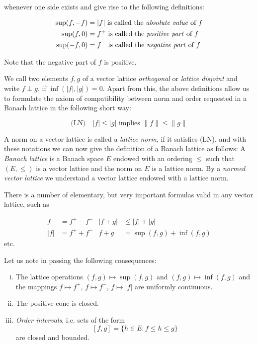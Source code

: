 \pagebreak

whenever one side exists and give rise to the following definitions:

\begin{align*}
\sup(f,-f) &= |f| \text{ is called the \emph{absolute value} of } f \\
\sup(f,0) &= f^{+} \text{ is called the \emph{positive part} of } f \\
\sup(-f,0) &= f^{-} \text{ is called the \emph{negative part} of } f
\end{align*}

Note that the negative part of $ f $ is positive.

We call two elements $ f, g $ of a vector lattice \emph{orthogonal} or \emph{lattice disjoint} and write $ f \perp g $, if $ \inf(|f|,|g|) = 0 $.
Apart from this, the above definitions allow us to formulate the axiom of compatibility between norm and order requested in a Banach lattice in the following short way:

\begin{equation}\label{eq:c1-1}
\text{(LN)} \quad |f| \leq |g| \text{ implies } \|f\| \leq \|g\|
\end{equation}

A norm on a vector lattice is called a \emph{lattice norm}, if it satisfies (LN), and with these notations we can now give the definition of a Banach lattice as follows:
A \emph{Banach lattice} is a Banach space $ E $ endowed with an ordering $ \leq $ such that $ (E,\leq) $ is a vector lattice and the norm on $ E $ is a lattice norm.
By a \emph{normed vector lattice} we understand a vector lattice endowed with a lattice norm.

There is a number of elementary, but very important formulas valid in any vector lattice, such as

\begin{align*}
f &= f^{+} - f^{-} & |f + g| &\leq |f| + |g| \\
|f| &= f^{+} + f^{-} & f + g &= \sup(f,g) + \inf(f,g)
\end{align*}
etc.

Let us note in passing the following consequences:

\begin{enumerate}[(i)]
\item The lattice operations $ (f,g) \mapsto \sup(f,g) $ and $ (f,g) \mapsto \inf(f,g) $ and the mappings $ f \mapsto f^{+} $, $ f \mapsto f^{-} $, $ f \mapsto |f| $ are uniformly continuous.
\item The positive cone is closed.
\item \emph{Order intervals}, i.e. sets of the form
\[
[f,g] = \{ h \in E \colon f \leq h \leq g \}
\]
are closed and bounded.
\end{enumerate}

